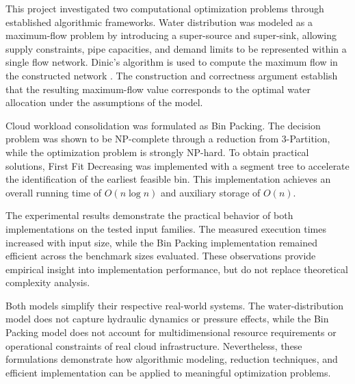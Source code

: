 \documentclass[conference]{IEEEtran}
\begin{document}
This project investigated two computational optimization problems
through established algorithmic frameworks. Water distribution
was modeled as a maximum-flow problem by introducing a
super-source and super-sink, allowing supply constraints, pipe
capacities, and demand limits to be represented within a single
flow network. Dinic's algorithm is used to compute the maximum flow
in the constructed network \cite{clrs}. The construction and correctness argument
establish that the resulting maximum-flow value corresponds
to the optimal water allocation under the assumptions of the
model.

Cloud workload consolidation was formulated as Bin Packing.
The decision problem was shown to be NP-complete through a
reduction from 3-Partition, while the optimization problem is
strongly NP-hard. To obtain practical solutions, First Fit
Decreasing was implemented with a segment tree to accelerate
the identification of the earliest feasible bin. This
implementation achieves an overall running time of
$O(n\log n)$ and auxiliary storage of $O(n)$.

The experimental results demonstrate the practical behavior
of both implementations on the tested input families.
The measured execution times increased with input size,
while the Bin Packing implementation remained efficient
across the benchmark sizes evaluated. These observations
provide empirical insight into implementation performance,
but do not replace theoretical complexity analysis.

Both models simplify their respective real-world systems.
The water-distribution model does not capture hydraulic
dynamics or pressure effects, while the Bin Packing model
does not account for multidimensional resource requirements
or operational constraints of real cloud infrastructure.
Nevertheless, these formulations demonstrate how
algorithmic modeling, reduction techniques, and efficient
implementation can be applied to meaningful optimization
problems.











\end{document}
